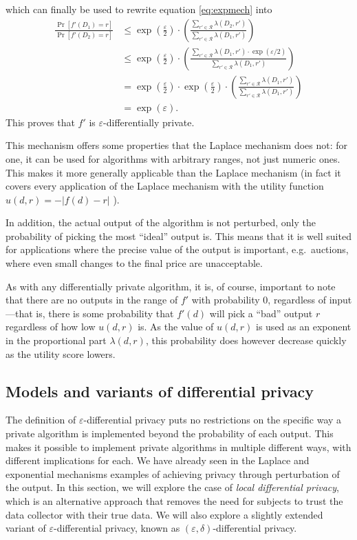 \documentclass[a4paper,12pt]{article}
\newcommand{\fancy}{\mathcal}
\renewcommand{\epsilon}{\varepsilon}
\begin{document}
which can finally be used to rewrite equation \ref{eq:expmech} into
\begin{align*}
    \frac{\Pr[f'(D_1) = r]}{\Pr[f'(D_2) = r]} &\leq \exp \left( \frac{\epsilon}{2} \right) \cdot \left( \frac{\sum_{r'\in\fancy{R}} \lambda(D_2,r')}{\sum_{r'\in\fancy{R}} \lambda(D_1,r')} \right) \\
        &\leq \exp\left( \frac{\epsilon}{2} \right) \cdot \left( \frac{\sum_{r'\in\fancy{R}} \lambda(D_1,r')\cdot \exp(\epsilon/2)}{\sum_{r'\in\fancy{R}} \lambda(D_1,r')} \right) \\
        &= \exp\left( \frac{\epsilon}{2} \right) \cdot \exp\left( \frac{\epsilon}{2} \right) \cdot \left( \frac{\sum_{r'\in\fancy{R}} \lambda(D_1,r')}{\sum_{r'\in\fancy{R}} \lambda(D_1,r')} \right) \\
        &= \exp(\epsilon).
\end{align*}
This proves that $f'$ is $\epsilon$-differentially private. 

This mechanism offers some properties that the Laplace mechanism does not: for one, it can be used for algorithms with arbitrary ranges, not just numeric ones. This makes it more generally applicable than the Laplace mechanism (in fact it covers every application of the Laplace mechanism with the utility function $u(d,r)=-|f(d)-r|$ \cite{sherry_exponentialmech}).

In addition, the actual output of the algorithm is not perturbed, only the probability of picking the most ``ideal'' output is. This means that it is well suited for applications where the precise value of the output is important, e.g.\ auctions, where even small changes to the final price are unacceptable.

As with any differentially private algorithm, it is, of course, important to note that there are no outputs in the range of $f'$ with probability 0, regardless of input---that is, there is some probability that $f'(d)$ will pick a ``bad'' output $r$ regardless of how low $u(d, r)$ is. As the value of $u(d,r)$ is used as an exponent in the proportional part $\lambda(d,r)$, this probability does however decrease quickly as the utility score lowers.

\subsection{Models and variants of differential privacy \label{sec:variants}}

The definition of $\epsilon$-differential privacy puts no restrictions on the specific way a private algorithm is implemented beyond the probability of each output. This makes it possible to implement private algorithms in multiple different ways, with different implications for each. We have already seen in the Laplace and exponential mechanisms examples of achieving privacy through perturbation of the output. In this section, we will explore the case of \emph{local differential privacy}, which is an alternative approach that removes the need for subjects to trust the data collector with their true data. We will also explore a slightly extended variant of $\epsilon$-differential privacy, known as $(\epsilon,\delta)$-differential privacy.
\end{document}
